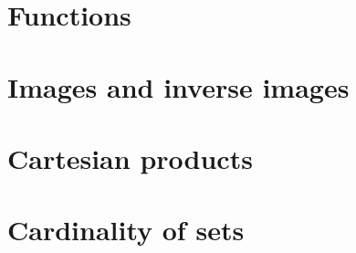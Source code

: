 \documentclass[../main.tex]{subfiles}
\begin{document}
\addtocounter{section}{2}
\section{Functions}

\section{Images and inverse images}

\section{Cartesian products}

\section{Cardinality of sets}
\end{document}
